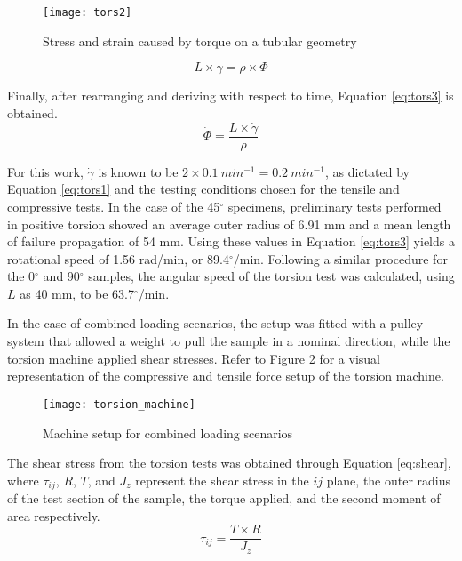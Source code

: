 \documentclass[main.tex]{subfiles}
\begin{document}
\begin{figure}[h]
	\center
	\texttt{[image: tors2]}
	\caption{Stress and strain caused by torque on a tubular geometry~\cite{Obst2018}} \label{fig:torscal}
\end{figure} 

\begin{equation}\label{eq:tors2}
L\times \gamma= \rho \times \Phi  
\end{equation}

Finally, after rearranging and deriving with respect to time, Equation \ref{eq:tors3} is obtained.
\begin{equation}\label{eq:tors3}
\dot{\Phi}=\frac{L\times\dot{\gamma}}{\rho}  
\end{equation}

For this work, $\dot{\gamma}$ is known to be $2 \times 0.1~min^{-1}= 0.2~min^{-1}$, as dictated by Equation \ref{eq:tors1} and the testing conditions chosen for the tensile and compressive tests. In the case of the 45$^\circ$ specimens, preliminary tests performed in positive torsion showed an average outer radius of 6.91 mm and a mean length of failure propagation of 54 mm. Using these values in Equation \ref{eq:tors3} yields a rotational speed of 1.56 rad/min, or 89.4$^\circ$/min. Following a similar procedure for the 0$^\circ$ and 90$^\circ$ samples, the angular speed of the torsion test was calculated, using $L$ as 40 mm, to be 63.7$^\circ$/min.%

In the case of combined loading scenarios, the setup was fitted with a pulley system that allowed a weight to pull the sample in a nominal direction, while the torsion machine applied shear stresses. Refer to Figure \ref{fig:torscomb} for a visual representation of the compressive and tensile force setup of the torsion machine. 

\begin{figure}[!htbp]
	\center
	\texttt{[image: torsion\_machine]}
	\caption{Machine setup for combined loading scenarios} \label{fig:torscomb}
\end{figure}

The shear stress from the torsion tests was obtained through Equation \ref{eq:shear}, where $\tau_{ij}$, $R$, $T$, and $J_{z}$ represent the shear stress in the $ij$ plane, the outer radius of the test section of the sample, the torque applied, and the second moment of area respectively.
\begin{equation}\label{eq:shear}
\tau_{ij}=\frac{T\times R}{J_{z}}  
\end{equation}
\end{document}
